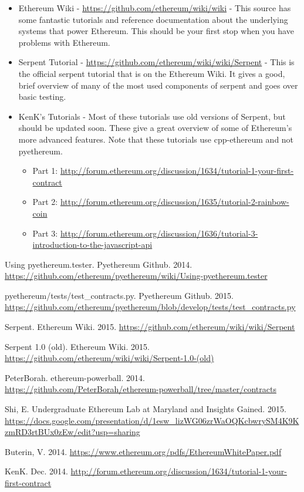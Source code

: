 \documentclass[12pt]{article}
\begin{document}
\begin{itemize}
	\item Ethereum Wiki - \url{https://github.com/ethereum/wiki/wiki} - This source has some fantastic tutorials and reference documentation about the underlying systems that power Ethereum. This should be your first stop when you have problems with Ethereum.
	\item Serpent Tutorial - \url{https://github.com/ethereum/wiki/wiki/Serpent} - This is the official serpent tutorial that is on the Ethereum Wiki. It gives a good, brief overview of many of the most used components of serpent and goes over basic testing.
	\item KenK's Tutorials - Most of these tutorials use old versions of Serpent, but should be updated soon. These give a great overview of some of Ethereum's more advanced features. Note that these tutorials use cpp-ethereum and not pyethereum.
	\begin{itemize}
	\item Part 1: \url{http://forum.ethereum.org/discussion/1634/tutorial-1-your-first-contract}
	\item Part 2: \url{http://forum.ethereum.org/discussion/1635/tutorial-2-rainbow-coin}
	\item Part 3: \url{http://forum.ethereum.org/discussion/1636/tutorial-3-introduction-to-the-javascript-api}
	\end{itemize}
\end{itemize}

\begin{thebibliography}{9}

	Using pyethereum.tester. Pyethereum Github. 2014. \url{https://github.com/ethereum/pyethereum/wiki/Using-pyethereum.tester}

	pyethereum/tests/test\_contracts.py. Pyethereum Github. 2015. \url{https://github.com/ethereum/pyethereum/blob/develop/tests/test_contracts.py}

	Serpent. Ethereum Wiki. 2015. \url{https://github.com/ethereum/wiki/wiki/Serpent}

	Serpent 1.0 (old). Ethereum Wiki. 2015. \url{https://github.com/ethereum/wiki/wiki/Serpent-1.0-(old)}

	PeterBorah. ethereum-powerball. 2014. \url{https://github.com/PeterBorah/ethereum-powerball/tree/master/contracts}

	Shi, E. Undergraduate Ethereum Lab at Maryland and Insights Gained. 2015. \url{https://docs.google.com/presentation/d/1esw_lizWG06zrWaOQKcbwrySM4K9KzmRD3rtBUx0zEw/edit?usp=sharing}

	Buterin, V. 2014. \url{https://www.ethereum.org/pdfs/EthereumWhitePaper.pdf}

	KenK. Dec. 2014. \url{http://forum.ethereum.org/discussion/1634/tutorial-1-your-first-contract}
\end{thebibliography}
\end{document}
